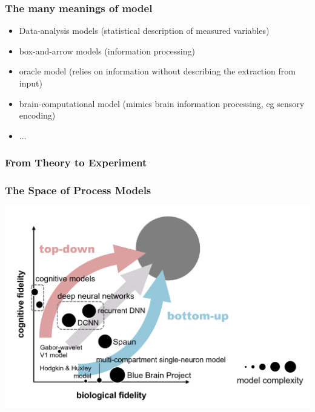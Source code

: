 \documentclass[
t, %
10pt, %
aspectratio=1610, %
ngerman,
english,
]{beamer}
\begin{document}
\begin{frame}
    \frametitle{The many meanings of model}
    \begin{itemize}
     \item Data-analysis models (statistical description of measured variables)
     \item box-and-arrow models (information processing)
     \item oracle model (relies on information without describing the extraction from input)
     \item brain-computational model (mimics brain information processing, eg sensory encoding)
     \item ...
    \end{itemize}
\end{frame}


\begin{frame}
    \frametitle{From Theory to Experiment}
\end{frame}

\begin{frame}
    \frametitle{The Space of Process Models}
    \centering
    \includegraphics[height=0.7\textheight]{figures/figure3}
\end{frame}
\end{document}
